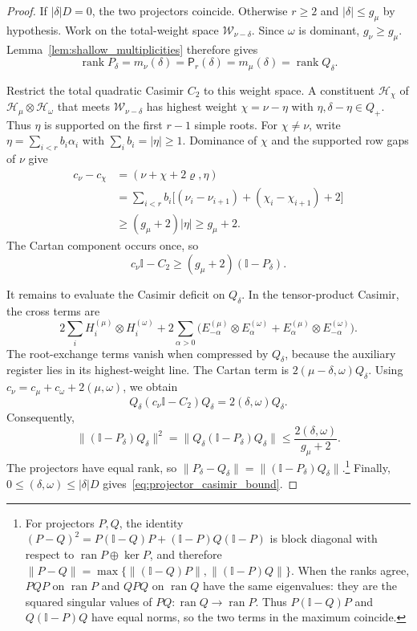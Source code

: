 \documentclass[a4paper,onecolumn,11pt]{quantumarticle}
\def\id{\mathbb{I}}
\begin{document}
\begin{proof}
If $|\delta|D=0$, the two projectors coincide.
Otherwise $r\ge2$ and $|\delta|\le g_\mu$ by hypothesis.
Work on the total-weight space $\mathcal W_{\nu-\delta}$.
Since $\omega$ is dominant, $g_\nu\ge g_\mu$. Lemma~\ref{lem:shallow_multiplicities}
therefore gives
\[
\operatorname{rank}P_\delta
=m_\nu(\delta)=\mathsf P_r(\delta)=m_\mu(\delta)
=\operatorname{rank}Q_\delta.
\]

Restrict the total quadratic Casimir $C_2$ to this weight space.
A constituent $\mathcal H_\chi$ of $\mathcal H_\mu\otimes\mathcal H_\omega$
that meets $\mathcal W_{\nu-\delta}$ has highest weight $\chi=\nu-\eta$ with
$\eta,\delta-\eta\in Q_+$. Thus $\eta$ is supported on the first
$r-1$ simple roots. For $\chi\ne\nu$, write
$\eta=\sum_{i<r}b_i\alpha_i$ with $\sum_i b_i=|\eta|\ge1$.
Dominance of $\chi$ and the supported row gaps of $\nu$ give
\begin{align}\label{eq:casimir_slice_gap}
c_\nu-c_\chi
&=(\nu+\chi+2\varrho,\eta)\nonumber\\
&=\sum_{i<r}b_i
  \bigl[(\nu_i-\nu_{i+1})+(\chi_i-\chi_{i+1})+2\bigr]\nonumber\\
&\ge(g_\mu+2)|\eta|\ge g_\mu+2.
\end{align}
The Cartan component occurs once, so
\[
c_\nu\id-C_2\ge(g_\mu+2)(\id-P_\delta).
\]

It remains to evaluate the Casimir deficit on $Q_\delta$. In the tensor-product
Casimir, the cross terms are
\[
2\sum_i H_i^{(\mu)}\otimes H_i^{(\omega)}
+2\sum_{\alpha>0}
\bigl(E_{-\alpha}^{(\mu)}\otimes E_\alpha^{(\omega)}
     +E_\alpha^{(\mu)}\otimes E_{-\alpha}^{(\omega)}\bigr).
\]
The root-exchange terms vanish when compressed by $Q_\delta$, because the
auxiliary register lies in its highest-weight line. The Cartan term is
$2(\mu-\delta,\omega)Q_\delta$. Using
$c_\nu=c_\mu+c_\omega+2(\mu,\omega)$, we obtain
\begin{equation}\label{eq:casimir_deficit_compression}
Q_\delta(c_\nu\id-C_2)Q_\delta=2(\delta,\omega)Q_\delta.
\end{equation}
Consequently,
\[
\|(\id-P_\delta)Q_\delta\|^2
=\|Q_\delta(\id-P_\delta)Q_\delta\|
\le\frac{2(\delta,\omega)}{g_\mu+2}.
\]
The projectors have equal rank, so
$\|P_\delta-Q_\delta\|=\|(\id-P_\delta)Q_\delta\|$.\footnote{For
projectors $P,Q$, the identity
$(P-Q)^2=P(\id-Q)P+(\id-P)Q(\id-P)$ is block diagonal with respect
to $\operatorname{ran}P\oplus\ker P$, and therefore
$\|P-Q\|=\max\{\|(\id-Q)P\|,\|(\id-P)Q\|\}$.
When the ranks agree, $PQP$ on $\operatorname{ran}P$ and $QPQ$ on
$\operatorname{ran}Q$ have the same eigenvalues: they are the squared singular
values of $PQ:\operatorname{ran}Q\to\operatorname{ran}P$.
Thus $P(\id-Q)P$ and $Q(\id-P)Q$ have equal norms, so the two
terms in the maximum coincide.}
Finally,
$0\le(\delta,\omega)\le|\delta|D$ gives~\eqref{eq:projector_casimir_bound}.
\end{proof}
\end{document}
